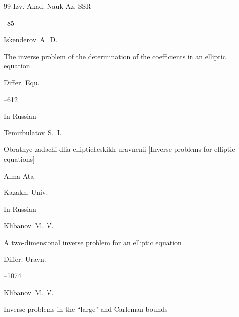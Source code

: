 \begin{thebibliography}{99}
\jour  Izv. Akad. Nauk Az. SSR



--85 








\by Iskenderov~A.~D.

\paper The inverse problem of the determination of the coefficients in an elliptic equation

\jour Differ. Equ.


--612 







\lang In Russian

\by Temirbulatov~S.~I.

\book Obratnye zadachi dlia ellipticheskikh uravnenii \rm [Inverse problems for elliptic equations]

\publaddr Alma-Ata

\publ Kazakh. Univ.










\lang In Russian

\by Klibanov~M.~V.

\paper A two-dimensional inverse problem for an elliptic equation

\jour Differ. Uravn. 



--1074 









\by Klibanov~M.~V.


\paper Inverse problems in the ``large'' and Carleman bounds


\end{thebibliography}
